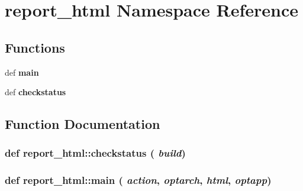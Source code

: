 \section{report\_\-html Namespace Reference}
\label{namespacereport__html}


\subsection*{Functions}
\begin{CompactItemize}
\item 
def {\bf main}
\item 
def {\bf checkstatus}
\end{CompactItemize}


\subsection{Function Documentation}
\subsubsection{\setlength{\rightskip}{0pt plus 5cm}def report\_\-html::checkstatus ( {\em build})}\label{namespacereport__html_1c3f540dc04ff873d57a32f805254950}


\subsubsection{\setlength{\rightskip}{0pt plus 5cm}def report\_\-html::main ( {\em action},  {\em optarch},  {\em html},  {\em optapp})}\label{namespacereport__html_615b2817f35af017ebbedc73a69a48d4}



